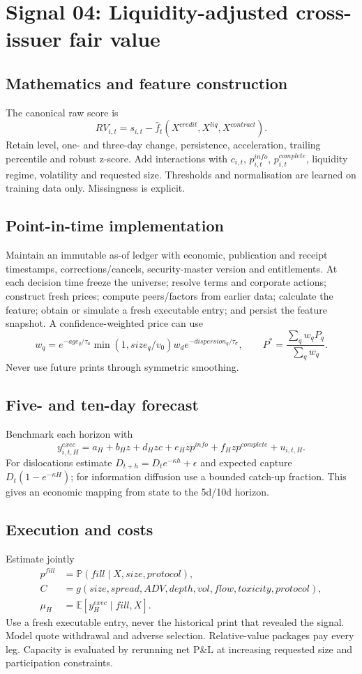 \documentclass[10pt]{article}
\newcommand{\E}{\mathbb{E}}\newcommand{\Pp}{\mathbb{P}}
\begin{document}
\section{Signal 04: Liquidity-adjusted cross-issuer fair value}
\subsection{Mathematics and feature construction}
The canonical raw score is
\begin{equation}RV_{i,t}=s_{i,t}-\widehat f_t(X^{credit},X^{liq},X^{contract}).\end{equation}
Retain level, one- and three-day change, persistence, acceleration, trailing percentile and robust z-score. Add interactions with $c_{i,t}$, $p^{info}_{i,t}$, $p^{complete}_{i,t}$, liquidity regime, volatility and requested size. Thresholds and normalisation are learned on training data only. Missingness is explicit.

\subsection{Point-in-time implementation}
Maintain an immutable as-of ledger with economic, publication and receipt timestamps, corrections/cancels, security-master version and entitlements. At each decision time freeze the universe; resolve terms and corporate actions; construct fresh prices; compute peers/factors from earlier data; calculate the feature; obtain or simulate a fresh executable entry; and persist the feature snapshot. A confidence-weighted price can use
\[w_q=e^{-age_q/\tau_a}\min(1,size_q/v_0)w_d e^{-dispersion_q/\tau_\sigma},\qquad P^*=\frac{\sum_qw_qP_q}{\sum_qw_q}.\]
Never use future prints through symmetric smoothing.

\subsection{Five- and ten-day forecast}
Benchmark each horizon with
\[y^{exec}_{i,t,H}=a_H+b_Hz+d_Hzc+e_Hzp^{info}+f_Hzp^{complete}+u_{i,t,H}.\]
For dislocations estimate $D_{t+h}=D_te^{-\kappa h}+\epsilon$ and expected capture $D_t(1-e^{-\kappa H})$; for information diffusion use a bounded catch-up fraction. This gives an economic mapping from state to the 5d/10d horizon.

\subsection{Execution and costs}
Estimate jointly
\begin{align}
p^{fill}&=\Pp(fill\mid X,size,protocol),\\
C&=g(size,spread,ADV,depth,vol,flow,toxicity,protocol),\\
\mu_H&=\E[y^{exec}_H\mid fill,X].
\end{align}
Use a fresh executable entry, never the historical print that revealed the signal. Model quote withdrawal and adverse selection. Relative-value packages pay every leg. Capacity is evaluated by rerunning net P\&L at increasing requested size and participation constraints.
\end{document}
